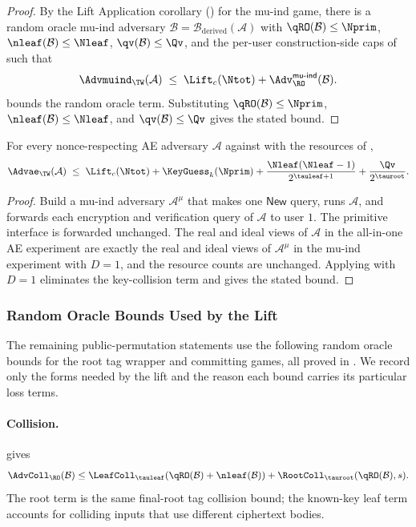 \begin{proof}
By the Lift Application corollary () for the
mu-ind game, there is a random oracle mu-ind adversary
$\mathcal{B} = \mathcal{B}_{\mathrm{derived}}(\mathcal{A})$ with
$\qRO(\mathcal{B}) \leq \Nprim$, $\nleaf(\mathcal{B}) \leq \Nleaf$,
$\qv(\mathcal{B}) \leq \Qv$, and the per-user construction-side caps of
 such that
\[
  \Advmuind_\TW(\mathcal{A})
  \;\leq\;
  \Lift_c(\Ntot) + \Adv^{\mathsf{mu\text{-}ind}}_{\RO}(\mathcal{B}).
\]
 bounds the random oracle term. Substituting
$\qRO(\mathcal{B}) \leq \Nprim$,
$\nleaf(\mathcal{B}) \leq \Nleaf$, and
$\qv(\mathcal{B}) \leq \Qv$ gives the stated bound.
\end{proof}

\begin{corollary}
\label{cor:ae}
For every nonce-respecting AE adversary $\mathcal{A}$ against \TW{}
with the resources of ,
\[
  \Advae_\TW(\mathcal{A})
  \;\leq\;
  \Lift_c(\Ntot)
  + \KeyGuess_k(\Nprim)
  + \frac{\Nleaf(\Nleaf - 1)}{2^{\tauleaf + 1}}
  + \frac{\Qv}{2^{\tauroot}}.
\]
\end{corollary}

\begin{proof}
Build a mu-ind adversary $\mathcal{A}^{\mu}$ that makes one
$\mathsf{New}$ query, runs $\mathcal{A}$, and forwards each
encryption and verification query of $\mathcal{A}$ to user $1$. The
primitive interface is forwarded unchanged. The real and ideal views of
$\mathcal{A}$ in the all-in-one AE experiment are exactly the real and
ideal views of $\mathcal{A}^{\mu}$ in the mu-ind experiment with
$D = 1$, and the resource counts are unchanged. Applying
 with $D = 1$ eliminates the key-collision term and
gives the stated bound.
\end{proof}

\subsubsection{Random Oracle Bounds Used by the Lift}
\label{sec:thms-pp}

The remaining public-permutation statements use the following random
oracle bounds for the root tag wrapper and committing games, all proved in
. We record only the forms needed by the lift and the
reason each bound carries its particular loss terms.

\paragraph{Collision.}
 gives
\[
  \AdvColl_{\RO}(\mathcal{B})
  \leq
  \LeafColl_{\tauleaf}(\qRO(\mathcal{B})+\nleaf(\mathcal{B}))
  + \RootColl_{\tauroot}(\qRO(\mathcal{B}), s).
\]
The root term is the same final-root tag collision bound; the known-key
leaf term accounts for colliding inputs that use different ciphertext
bodies.

